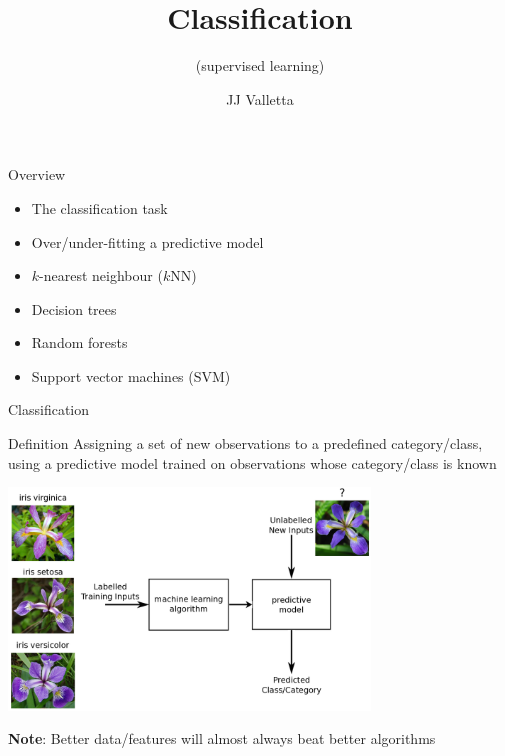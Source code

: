 \documentclass[pdf]{beamer}
\title{Classification}
\subtitle{(supervised learning)}
\author{JJ Valletta}
\newif\ifplacelogo %
\begin{document}
\begin{frame}
\titlepage
\end{frame}
\placelogofalse %
\begin{frame}{Overview}
\begin{itemize}\addtolength{\itemsep}{0.5\baselineskip}
	\item<2-> The classification task
	\item<3-> Over/under-fitting a predictive model
 	\item<4-> $k$-nearest neighbour ($k$NN)
	\item<5-> Decision trees
	\item<6-> Random forests
	\item<7-> Support vector machines (SVM)
\end{itemize}
\end{frame}
\begin{frame}{Classification}
\begin{block}{Definition}
Assigning a set of new observations to a predefined category/class, using a predictive model trained
on observations whose category/class is known
\end{block}
\vfill
\begin{center}
	\includegraphics[width=0.72\textwidth]{classification.png}
\end{center}
\vfill
\textbf{Note}: Better data/features will almost always beat better algorithms
\end{frame}
\end{document}
